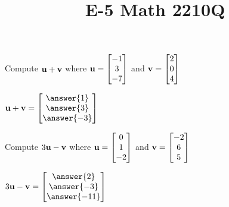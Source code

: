 \documentclass{ximera}
\newcommand{\bu}{{\bf u}}
\newcommand{\bv}{{\bf v}}
\begin{document}
  	\title{E-5  \hfill Math 2210Q} 

  	
  
 

  	 	\begin{question}
  
  	Compute $\bu+\bv$ where $\bu =	\begin{bmatrix}
  			-1\\3\\-7
  		\end{bmatrix}$ and $\bv = \begin{bmatrix}
  		2\\0\\4
  		\end{bmatrix}$
  		
  		$\bu +\bv = \begin{bmatrix}
  	\answer{1}\\\answer{3}\\\answer{-3}
  		\end{bmatrix}$
  	
  		\end{question}
  		
  		\begin{question}
  	Compute $3\bu-\bv$ where $\bu =	\begin{bmatrix}
  	0\\1\\-2
  	\end{bmatrix}$ and $\bv = \begin{bmatrix}
  	-2\\6\\5
  	\end{bmatrix}$
  	
  	$3\bu -\bv = \begin{bmatrix}
  	\answer{2}\\\answer{-3}\\\answer{-11}
  	\end{bmatrix}$
  		
  	\end{question}
  	
\end{document}
